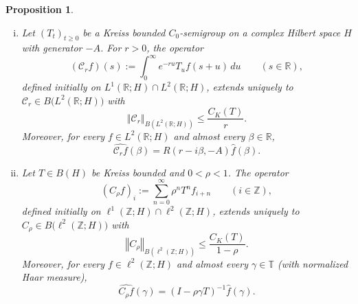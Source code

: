 \documentclass[12pt]{amsart}
\theoremstyle{plain}
\newtheorem{prop}[thm]{Proposition}
\theoremstyle{remark}
\theoremstyle{definition}
\newcommand{\R}{\mathbb{R}}
\newcommand{\Z}{\mathbb{Z}}
\newcommand{\T}{\mathbb{T}}
\newcommand{\norm}[1]{\left\Vert #1\right\Vert}
\begin{document}
	
	\begin{prop}\label{propHilbertMultipliersApp}
		\begin{enumerate}[(i)]
			
			\item Let $(T_t)_{t\ge0}$ be a Kreiss bounded $C_0$-semigroup on a complex Hilbert space $H$ with generator $-A$. For $r>0$, the operator 
			\[
			(\mathcal C_r f)(s) := \int_0^\infty e^{-ru}T_u f(s+u)\,du \qquad (s\in\R),
			\]
			defined initially on $L^1(\R;H)\cap L^2(\R;H)$, extends uniquely to $\mathcal C_r\in B\bigl(L^2(\R;H)\bigr)$ with
			\begin{equation}\label{eq:continuous-Cr-bound-app}
				\norm{\mathcal C_r}_{B(L^2(\R;H))} \le \frac{C_K(T)}{r}.
			\end{equation}
			Moreover, for every $f\in L^2(\R;H)$ and almost every $\beta\in\R$,
			\begin{equation}\label{eqContinuousLMultiplierApp}
				\widehat{\mathcal C_r f}(\beta) = R(r-i\beta,-A)\widehat f(\beta).
			\end{equation}
			
			\item Let $T\in B(H)$ be Kreiss bounded and $0<\rho<1$. The operator
			\[
			(C_\rho f)_i := \sum_{n=0}^\infty \rho^nT^nf_{i+n} \qquad (i\in\Z),
			\]
			defined initially on $\ell^1(\Z;H)\cap\ell^2(\Z;H)$, extends uniquely to $C_\rho\in B\bigl(\ell^2(\Z;H)\bigr)$ with
			\begin{equation}\label{eq:discrete-Crho-bound-app}
				\norm{C_\rho}_{B(\ell^2(\Z;H))} \le \frac{C_K(T)}{1-\rho}.
			\end{equation}
			Moreover, for every $f\in\ell^2(\Z;H)$ and almost every $\gamma\in\T$ (with normalized Haar measure),
			\begin{equation}\label{eqDiscreteMultiplierApp}
				\widehat{C_\rho f}(\gamma) = (I-\rho\gamma T)^{-1}\widehat f(\gamma).
			\end{equation}
			
		\end{enumerate}
	\end{prop}
	
\end{document}
